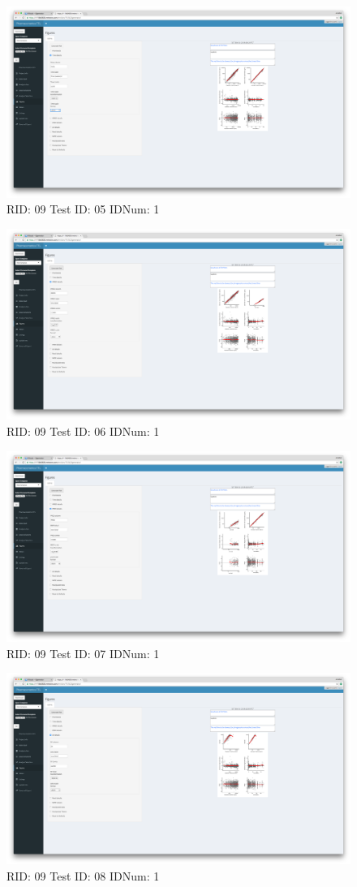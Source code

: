 \begin{figure}[H]
\includegraphics[width=.8\textwidth]{screencaps/09-05-1.png}
\caption{RID: 09 Test ID: 05 IDNum: 1}
\end{figure}
\begin{figure}[H]
\includegraphics[width=.8\textwidth]{screencaps/09-06-1.png}
\caption{RID: 09 Test ID: 06 IDNum: 1}
\end{figure}
\begin{figure}[H]
\includegraphics[width=.8\textwidth]{screencaps/09-07-1.png}
\caption{RID: 09 Test ID: 07 IDNum: 1}
\end{figure}
\begin{figure}[H]
\includegraphics[width=.8\textwidth]{screencaps/09-08-1.png}
\caption{RID: 09 Test ID: 08 IDNum: 1}
\end{figure}
